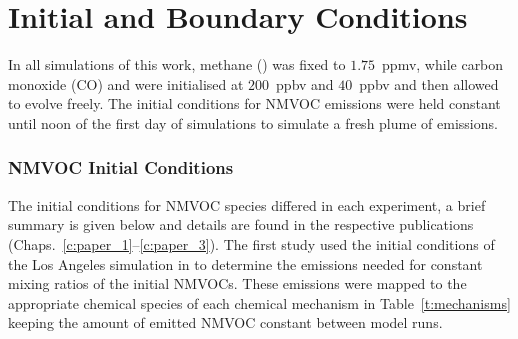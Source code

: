 \section{Initial and Boundary Conditions} \label{s:initial_conditions}
In all simulations of this work, methane () was fixed to $1.75$~ppmv, while carbon monoxide (CO) and  were initialised at $200$~ppbv and $40$~ppbv and then allowed to evolve freely.
The initial conditions for NMVOC emissions were held constant until noon of the first day of simulations to simulate a fresh plume of emissions.

\subsubsection{NMVOC Initial Conditions} 
The initial conditions for NMVOC species differed in each experiment, a brief summary is given below and details are found in the respective publications (Chaps.~\ref{c:paper_1}--\ref{c:paper_3}).
The first study used the initial conditions of the Los Angeles simulation in \citet{Butler:2011} to determine the emissions needed for constant mixing ratios of the initial NMVOCs.
These emissions were mapped to the appropriate chemical species of each chemical mechanism in Table~\ref{t:mechanisms} keeping the amount of emitted NMVOC constant between model runs.

